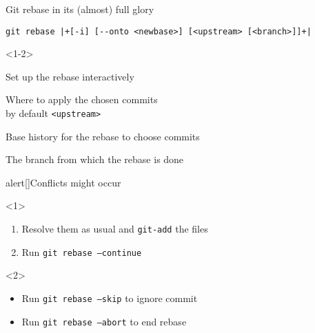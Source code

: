 \documentclass[usenames,svgnames,14pt]{beamer}
\begin{document}
\begin{frame}[fragile]{Git rebase in its (almost) full glory}
    \begin{lstlisting}[style=MyBash, xleftmargin=5mm, xrightmargin=5mm, aboveskip=-5mm, belowskip=-3mm]
        git rebase |+[-i] [--onto <newbase>] [<upstream> [<branch>]]+|
    \end{lstlisting}
    \begin{overlayarea}{\textwidth}{0.5\textheight}
        \begin{onlyenv}<1-2>
            \begin{description}
                \item[-i] Set up the rebase interactively
                \item[<newbase>] Where to apply the chosen commits\\ \then by default \texttt{<upstream>}
                \item[<upstream>] Base history for the rebase to choose commits
                \item[<branch>] The branch from which the rebase is done
            \end{description}
            \begin{varblock*}{alert}[\textwidth]{Conflicts might occur}
                \begin{overlayarea}{\textwidth}{0.12\textheight}
                    \begin{onlyenv}<1>
                        \begin{enumerate}
                            \item Resolve them as usual and \;\texttt{git-add}\; the files
                            \item Run \;\texttt{git rebase --continue}
                        \end{enumerate}
                    \end{onlyenv}
                    \begin{onlyenv}<2>
                        \vspace{-3pt}
                        \begin{itemize}
                            \item Run \;\texttt{git rebase --skip}\; to ignore commit
                            \item Run \;\texttt{git rebase --abort}\; to end rebase

\end{itemize}
\end{onlyenv}
\end{overlayarea}
\end{varblock*}
\end{onlyenv}
\end{overlayarea}
\end{frame}
\end{document}
